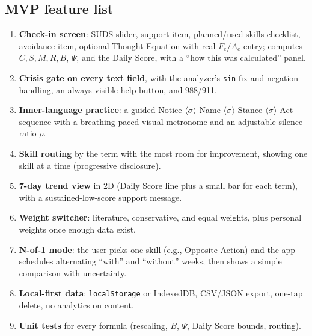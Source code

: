 \documentclass[11pt]{article}
\newcommand{\pause}[1]{\langle\sigma_{#1}\rangle}
\begin{document}
\subsection{MVP feature list}
\begin{enumerate}
\item \textbf{Check-in screen}: SUDS slider, support item, planned/used skills checklist, avoidance item, optional Thought Equation with real $F_e$/$A_e$ entry; computes $C,S,M,R,B$, $\Psi$, and the Daily Score, with a ``how this was calculated'' panel.
\item \textbf{Crisis gate on every text field}, with the analyzer's \texttt{sin} fix and negation handling, an always-visible help button, and 988/911.
\item \textbf{Inner-language practice}: a guided Notice $\pause{}$ Name $\pause{}$ Stance $\pause{}$ Act sequence with a breathing-paced visual metronome and an adjustable silence ratio $\rho$.
\item \textbf{Skill routing} by the term with the most room for improvement, showing one skill at a time (progressive disclosure).
\item \textbf{7-day trend view} in 2D (Daily Score line plus a small bar for each term), with a sustained-low-score support message.
\item \textbf{Weight switcher}: literature, conservative, and equal weights, plus personal weights once enough data exist.
\item \textbf{N-of-1 mode}: the user picks one skill (e.g., Opposite Action) and the app schedules alternating ``with'' and ``without'' weeks, then shows a simple comparison with uncertainty.
\item \textbf{Local-first data}: \texttt{localStorage} or IndexedDB, CSV/JSON export, one-tap delete, no analytics on content.
\item \textbf{Unit tests} for every formula (rescaling, $B$, $\Psi$, Daily Score bounds, routing).
\end{enumerate}
\end{document}
